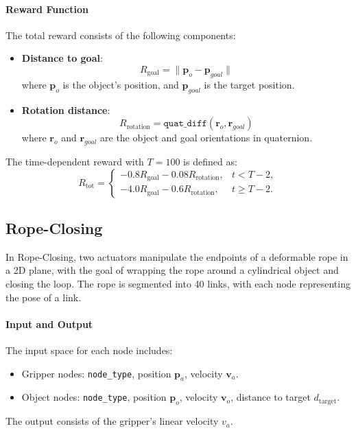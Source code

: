 \paragraph{Reward Function}
The total reward consists of the following components:
\begin{itemize}
    \item \textbf{Distance to goal}:
    \[
    R_\text{goal} = \lVert \mathbf{p}_o - \mathbf{p}_{goal} \rVert
    \]
    where $\mathbf{p}_o$ is the object's position, and $\mathbf{p}_{goal}$ is the target position.
    
    \item \textbf{Rotation distance}: \[
        R_\text{rotation} = \texttt{quat\_diff}(\mathbf{r}_o, \mathbf{r}_{goal})
    \]
    where $\mathbf{r}_o$ and $\mathbf{r}_{goal}$ are the object and goal orientations in quaternion.
\end{itemize}
The time-dependent reward with $T=100$ is defined as:
\[
R_\text{tot} = \begin{cases}
    - 0.8 R_\text{goal} - 0.08 R_\text{rotation}, & t < T-2, \\
    - 4.0 R_\text{goal} - 0.6 R_\text{rotation}, & t \geq T-2.
\end{cases}
\]

\subsection{Rope-Closing}
In Rope-Closing, two actuators manipulate the endpoints of a deformable rope in a 2D plane, with the goal of wrapping the rope around a cylindrical object and closing the loop. The rope is segmented into 40 links, with each node representing the pose of a link.



\paragraph{Input and Output}
The input space for each node includes:
\begin{itemize}
    \item Gripper nodes: \texttt{node\_type}, position $\mathbf{p}_a$, velocity $\mathbf{v}_a$.
    \item Object nodes: \texttt{node\_type}, position $\mathbf{p}_o$, velocity $\mathbf{v}_o$, distance to target $d_{\text{target}}$.
\end{itemize}
The output consists of the gripper's linear velocity $v_a$. 

